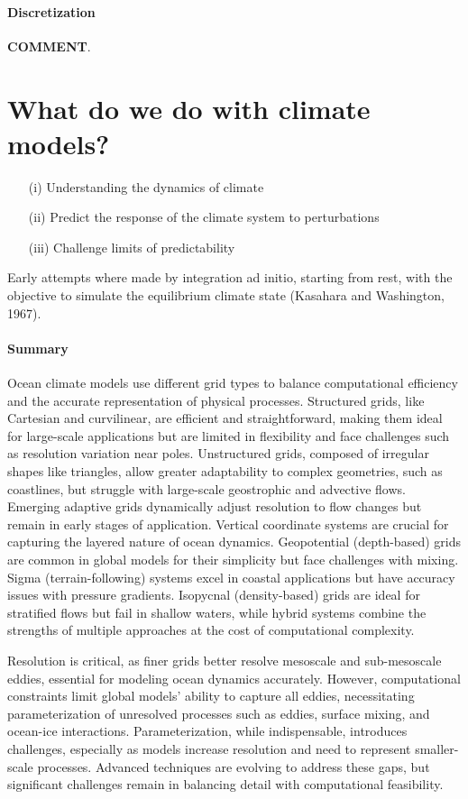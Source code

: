 \paragraph{Discretization} \textbf{COMMENT}.


\section{What do we do with climate models?}
\begin{enumerate}
	\item[(i)] Understanding the dynamics of climate
	\item[(ii)] Predict the response of the climate system to perturbations
	\item[(iii)] Challenge limits of predictability
\end{enumerate}
Early attempts where made by integration ad initio, starting from rest, with the objective to simulate the equilibrium climate state (Kasahara and Washington, 1967).

\paragraph{Summary}
Ocean climate models use different grid types to balance computational efficiency and the accurate representation of physical processes. Structured grids, like Cartesian and curvilinear, are efficient and straightforward, making them ideal for large-scale applications but are limited in flexibility and face challenges such as resolution variation near poles. Unstructured grids, composed of irregular shapes like triangles, allow greater adaptability to complex geometries, such as coastlines, but struggle with large-scale geostrophic and advective flows. Emerging adaptive grids dynamically adjust resolution to flow changes but remain in early stages of application. Vertical coordinate systems are crucial for capturing the layered nature of ocean dynamics. Geopotential (depth-based) grids are common in global models for their simplicity but face challenges with mixing. Sigma (terrain-following) systems excel in coastal applications but have accuracy issues with pressure gradients. Isopycnal (density-based) grids are ideal for stratified flows but fail in shallow waters, while hybrid systems combine the strengths of multiple approaches at the cost of computational complexity.

Resolution is critical, as finer grids better resolve mesoscale and sub-mesoscale eddies, essential for modeling ocean dynamics accurately. However, computational constraints limit global models' ability to capture all eddies, necessitating parameterization of unresolved processes such as eddies, surface mixing, and ocean-ice interactions. Parameterization, while indispensable, introduces challenges, especially as models increase resolution and need to represent smaller-scale processes. Advanced techniques are evolving to address these gaps, but significant challenges remain in balancing detail with computational feasibility.


